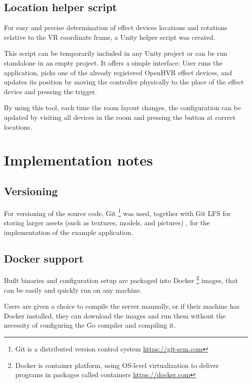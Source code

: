 \hypertarget{x-location-helper-script}{\subsection{Location helper script}}
For easy and precise determination of effect devices locations and rotations
relative to the VR coordinate frame, a Unity helper script was created.


This script can be temporarily included in any Unity project or can be run
standalone in an empty project. It offers a simple interface:
User runs the application, picks one of the already registered OpenHVR
effect devices, and updates its position by moving the controller physically
to the place of the effect device and pressing the trigger.


By using this tool, each time the room layout changes, the configuration can
be updated by visiting all devices in the room and pressing the button at
correct locations.


\hypertarget{x-implementation-notes}{\section{Implementation notes}}
\hypertarget{x-versioning}{\subsection{Versioning}}
For versioning of the source code, Git
\footnote{Git is a distributed version control system \href{https://git-scm.com}{https://git-scm.com}}
was used, together with Git LFS for
storing larger assets (such as textures, models, and pictures)
, for the implementation of the example application.


\hypertarget{x-docker-support}{\subsection{Docker support}}
Built binaries and configuration setup are packaged into Docker
\footnote{Docker is container platform, using OS-level virtualization to deliver programs in packages called containers \href{https://docker.com}{https://docker.com}}
images, that can be easily and quickly run on any machine.


Users are given a choice to compile the server manually, or if their machine has
Docker installed, they can download the images and run them without
the necessity of configuring the Go compiler and compiling it.

